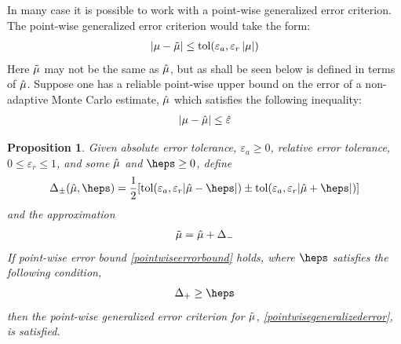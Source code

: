 \documentclass{iitthesis}
\newtheorem{proposition}[theorem]{Proposition}
\begin{document}
\label{chapter:meanMCg}
In many case it is possible to work with a point-wise generalized error criterion. 
The point-wise generalized error criterion would take the form:
\begin{align}|\mu -\tilde{\mu}| \leq \text{tol} (\varepsilon_a,\varepsilon_r \left \lvert \mu \right \rvert) \label{pointwisegeneralizederror} 
\end{align}
Here $\tilde{\mu}$ may not be the same as $\hat{\mu}$, but as shall be seen below is defined in terms of $\hat{\mu}$. Suppose one has a reliable point-wise upper bound on the error of a non-adaptive Monte Carlo estimate, $\hat{\mu}$ which satisfies the following inequality:
\begin{align}
|\mu-\hat{\mu}| \leq \hat{\varepsilon}  \label{pointwiseerrorbound} 
\end{align}
\begin{proposition}\label{meanMCgProp}
Given absolute error tolerance, $\varepsilon_a\geq 0$, relative error tolerance, $0 \leq \varepsilon_r\le 1$, and some $\hat{\mu}$ and $\heps\geq 0$, define
\begin{align}\Delta_{\pm}(\hmu,\heps) = \frac{1}{2} [\text{tol}(\varepsilon_a, \varepsilon_r |\hmu-\heps|) \pm \text{tol}(\varepsilon_a, \varepsilon_r |\hmu+\heps|)] \label{deltadef}
\end{align}
and the approximation
\begin{align}
\tilde{\mu} = \hat{\mu} + \Delta_{-} \label{appxsol}
\end{align}
If point-wise error bound  \eqref{pointwiseerrorbound}  holds, where $\heps$ satisfies the following condition,
\begin{align}\Delta_{+} \geq \heps\label{deltacondition}
\end{align}
 then the point-wise generalized error criterion for $\tilde{\mu}$, \eqref{pointwisegeneralizederror}, is satisfied. 
 \end{proposition}
\end{document}
